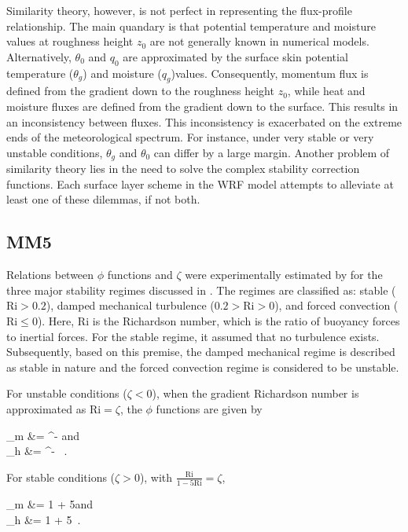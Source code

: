 Similarity theory, however, is not perfect in representing the flux-profile relationship. The main quandary is that potential temperature and moisture values at roughness height $z_0$ are not generally known in numerical models. Alternatively, $\theta_0$ and $q_0$ are approximated by the surface skin potential temperature ($\theta_g$) and moisture ($q_g$)values. Consequently, momentum flux is defined from the gradient down to the roughness height $z_0$, while heat and moisture fluxes are defined from the gradient down to the surface. This results in an inconsistency between fluxes. This inconsistency is exacerbated on the extreme ends of the meteorological spectrum. For instance, under very stable or very unstable conditions, $\theta_g$ and $\theta_0$ can differ by a large margin. Another problem of similarity theory lies in the need to solve the complex stability correction functions. Each surface layer scheme in the WRF model attempts to alleviate at least one of these dilemmas, if not both.

\subsection{MM5}
\label{sl-mm5-351}

Relations between $\phi$ functions and $\zeta$ were experimentally estimated by  \citet{Dyer} for the three major stability regimes discussed in  \citet{Zhang}. The regimes are classified as: stable ($\mathrm{Ri} > 0.2$), damped mechanical turbulence ($0.2 > \mathrm{Ri} > 0$), and forced convection ($\mathrm{Ri} \leq 0$). Here, $\mathrm{Ri}$ is the Richardson number, which is the ratio of buoyancy forces to inertial forces. For the stable regime, it assumed that no turbulence exists. Subsequently, based on this premise, the damped mechanical regime is described as stable in nature and the forced convection regime is considered to be unstable.

For unstable conditions ($\zeta < 0$), when the gradient Richardson number is approximated as $\mathrm{Ri} = \zeta$, the $\phi$ functions are given by

\bse \label{equation321}
\bal
\phi_m &= ^{-} \mbox{\quad and} \label{equation321a} \\
\phi_h &= ^{-} \mbox{ .} \label{equation321b}
\eal
\ese


For stable conditions ($\zeta > 0$), with $\frac{\mathrm{Ri}}{1-5\mathrm{Ri}} = \zeta$,

\bse \label{equation322}
\bal
\phi_m &= 1 + 5\zeta \mbox{\quad and} \label{equation322a}\\
\phi_h &= 1 + 5\zeta \mbox{ .} \label{equation322b}
\eal
\ese


